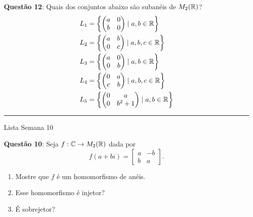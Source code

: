 \documentclass[12pt]{exam}
\begin{document}
    \vspace{.3cm}

    \noindent \textbf{Questão 12}: Quais dos conjuntos abaixo s\~ao suban\'eis de $M_2(\mathbb{R})$?
    \begin{align*}
        L_1 &= \left\{\begin{pmatrix}
            a & 0\\
            b & 0
        \end{pmatrix} \mid a, b \in \mathbb{R}\right\}\\
        L_2 &= \left\{\begin{pmatrix}
            a & b\\
            0 & c
        \end{pmatrix} \mid a, b, c \in \mathbb{R}\right\}\\
        L_3 &= \left\{\begin{pmatrix}
            a & 0\\
            0 & b
        \end{pmatrix} \mid a, b \in \mathbb{R}\right\}\\
        L_4 &= \left\{\begin{pmatrix}
            0 & a\\
            c & b
        \end{pmatrix} \mid a, b, c \in \mathbb{R}\right\}\\
        L_5 &= \left\{\begin{pmatrix}
            0 & a\\
            0 & b^2 + 1
        \end{pmatrix} \mid a, b \in \mathbb{R}\right\}
    \end{align*}

    \hrule
    \begin{center}
        Lista Semana 10
    \end{center}
    
    \noindent \textbf{Questão 10}: Seja $f : \mathbb{C} \to M_2(\mathbb{R})$ dada por
    \[
        f(a + bi) = \begin{bmatrix}
            a & -b\\
            b & a
        \end{bmatrix}.
    \]
    \begin{enumerate}[label=({\alph*})]
        \item Mostre que $f$ \'e um homomorfismo de an\'eis.
        
        \item Esse homomorfismo \'e injetor?
        
        \item \'E sobrejetor?
    \end{enumerate}
\end{document}
